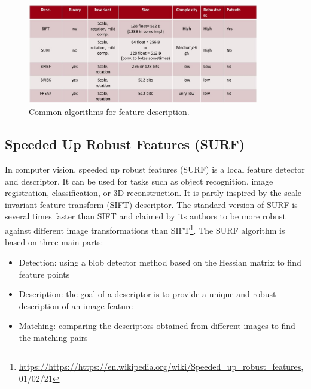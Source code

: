 \begin{figure}[h!]
    \centering
    \includegraphics[width=0.9\textwidth]{images/Descriptors.jpg}
    \caption{Common algorithms for feature description.}
    \label{fig:descriptors}    
\end{figure}


\subsection{Speeded Up Robust Features (SURF)}
In computer vision, speeded up robust features (SURF) is a local feature detector and descriptor. It can be used for tasks such as object recognition, image registration, classification, or 3D reconstruction. It is partly inspired by the scale-invariant feature transform (SIFT) descriptor. The standard version of SURF is several times faster than SIFT and claimed by its authors to be more robust against different image transformations than SIFT\footnote{\url{https://https://https://en.wikipedia.org/wiki/Speeded_up_robust_features}, 01/02/21}. The SURF algorithm is based on three main parts:
\begin{itemize}
\item Detection: using a blob detector method based on the Hessian matrix to find feature points
\item Description: the goal of a descriptor is to provide a unique and robust description of an image feature
\item Matching: comparing the descriptors obtained from different images to find the matching pairs
\end{itemize}



